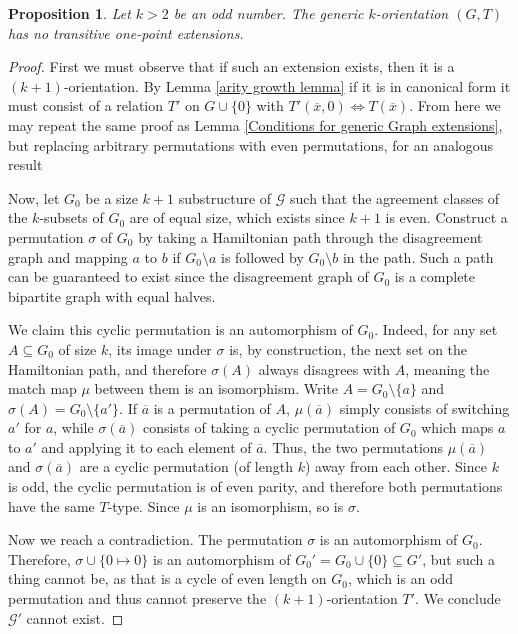 \documentclass{amsart}
\newtheorem{proposition}[theorem]{Proposition}
\def\graph{\mathcal{G}}
\newcommand{\set}[1]{\{#1 \}}
\begin{document}
\begin{proposition}\label{odd half of orientation theorem}
    Let $k > 2$ be an odd number. The generic $k$-orientation $(G, T)$ has no transitive one-point extensions.
\end{proposition}
\begin{proof}
    First we must observe that if such an extension exists, then it is a $(k+1)$-orientation. By Lemma \ref{arity growth lemma} if it is in canonical form it must consist of a relation $T'$ on $G\cup\set{0}$ with $T'(\overline{x}, 0) \Leftrightarrow T(\overline{x})$. From here we may repeat the same proof as Lemma \ref{Conditions for generic Graph extensions}, but replacing arbitrary permutations with even permutations, for an analogous result

    Now, let $G_0$ be a size $k+1$ substructure of $\graph$ such that the agreement classes of the $k$-subsets of $G_0$ are of equal size, which exists since $k+1$ is even. Construct a permutation $\sigma$ of $G_0$ by taking a Hamiltonian path through the disagreement graph and mapping $a$ to $b$ if $G_0 \setminus a$ is followed by $G_0 \setminus b$ in the path. Such a path can be guaranteed to exist since the disagreement graph of $G_0$ is a complete bipartite graph with equal halves. 
    
    We claim this cyclic permutation is an automorphism of $G_0$. Indeed, for any set $A \subseteq G_0$ of size $k$, its image under $\sigma$ is, by construction, the next set on the Hamiltonian path, and therefore $\sigma(A)$ always disagrees with $A$, meaning the match map $\mu$ between them is an isomorphism. Write $A = G_0 \setminus \set{a}$ and $\sigma(A) = G_0 \setminus \set{a'}$. If $\overline{a}$ is a permutation of $A$, $\mu(\overline{a})$ simply consists of switching $a'$ for $a$, while $\sigma(\overline{a})$ consists of taking a cyclic permutation of $G_0$ which maps $a$ to $a'$ and applying it to each element of $\overline{a}$. Thus, the two permutations $\mu(\overline{a})$ and $\sigma(\overline{a})$ are a cyclic permutation (of length $k$) away from each other. Since $k$ is odd, the cyclic permutation is of even parity, and therefore both permutations have the same $T$-type. Since $\mu$ is an isomorphism, so is $\sigma$.

    Now we reach a contradiction. The permutation $\sigma$ is an automorphism of $G_0$. Therefore, $\sigma \cup \set{0 \mapsto 0}$ is an automorphism of $G_0' = G_0 \cup\set{0} \subseteq G'$, but such a thing cannot be, as that is a cycle of even length on $G_0$, which is an odd permutation and thus cannot preserve the $(k+1)$-orientation $T'$. We conclude $\graph'$ cannot exist.
\end{proof}
\end{document}
